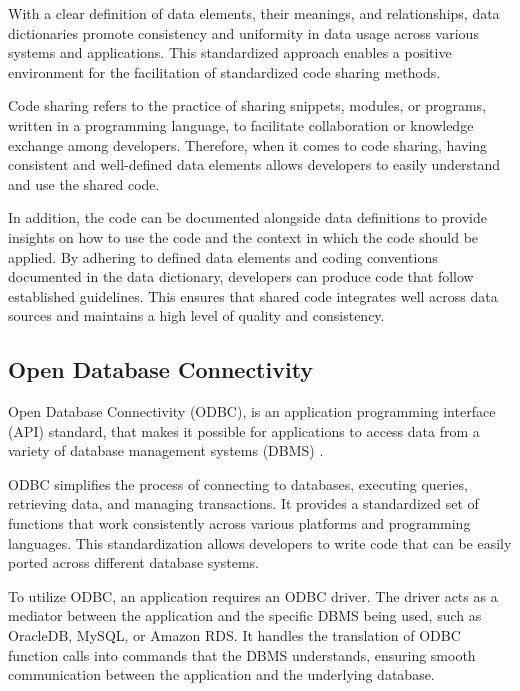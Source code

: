 With a clear definition of data elements, their meanings, and relationships, data dictionaries promote consistency and uniformity in data usage across various systems and applications. This standardized approach enables a positive environment for the facilitation of standardized code sharing methods. 

Code sharing refers to the practice of sharing snippets, modules, or programs, written in a programming language, to facilitate collaboration or knowledge exchange among developers. Therefore, when it comes to code sharing, having consistent and well-defined data elements allows developers to easily understand and use the shared code. 

In addition, the code can be documented alongside data definitions to provide insights on how to use the code and the context in which the code should be applied. By adhering to defined data elements and coding conventions documented in the data dictionary, developers can produce code that follow established guidelines. This ensures that shared code integrates well across data sources and maintains a high level of quality and consistency.

\subsection{Open Database Connectivity}
Open Database Connectivity (ODBC), is an application programming interface (API) standard, that makes it possible for applications to access data from a variety of database management systems (DBMS) \cite{David-Engel}.

ODBC simplifies the process of connecting to databases, executing queries, retrieving data, and managing transactions. It provides a standardized set of functions that work consistently across various platforms and programming languages. This standardization allows developers to write code that can be easily ported across different database systems.

To utilize ODBC, an application requires an ODBC driver. The driver acts as a mediator between the application and the specific DBMS being used, such as OracleDB, MySQL, or Amazon RDS. It handles the translation of ODBC function calls into commands that the DBMS understands, ensuring smooth communication between the application and the underlying database.


